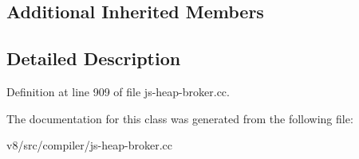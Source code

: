 \subsection*{Additional Inherited Members}


\subsection{Detailed Description}


Definition at line 909 of file js-\/heap-\/broker.\+cc.



The documentation for this class was generated from the following file\+:\begin{DoxyCompactItemize}
\item 
v8/src/compiler/js-\/heap-\/broker.\+cc\end{DoxyCompactItemize}
